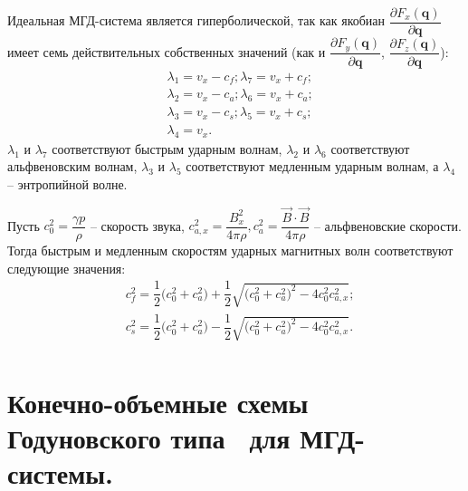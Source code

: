 \documentclass[14pt, a4paper, fleqn]{extreport}
\begin{document}
    Идеальная МГД-система является гиперболической,
    так как якобиан $\dfrac{\partial F_x(\textbf{q})}{\partial \textbf{q}}$
    имеет семь действительных собственных значений
    (как и 
    $\dfrac{\partial F_y(\textbf{q})}{\partial \textbf{q}}$,
    $\dfrac{\partial F_z(\textbf{q})}{\partial \textbf{q}}$):
    \begin{equation*}
    \begin{split}
        &\lambda_1 = v_x - c_f; \lambda_7 = v_x + c_f; \\
        &\lambda_2 = v_x - c_a; \lambda_6 = v_x + c_a; \\
        &\lambda_3 = v_x - c_s; \lambda_5 = v_x + c_s; \\
        &\lambda_4 = v_x.
    \end{split}
    \end{equation*}
    $\lambda_1$ и $\lambda_7$ соответствуют быстрым ударным волнам,
    $\lambda_2$ и $\lambda_6$ соответствуют альфвеновским волнам,
    $\lambda_3$ и $\lambda_5$ соответствуют медленным ударным волнам, а
    $\lambda_4$ -- энтропийной волне.
    
    Пусть 
    $c_0^2 = \dfrac{\gamma p}{\rho}$ -- скорость звука,
    $c_{a,x}^2 = \dfrac{B_x^2}{4\pi\rho}, 
     c_a^2 = \dfrac{\vec{B}\cdot\vec{B}}{4\pi\rho}$ -- альфвеновские скорости.
    Тогда быстрым и медленным скоростям ударных магнитных волн соответствуют следующие значения:
    \begin{equation*}
    \begin{split}
        &c_f^2 
            = \dfrac{1}{2}\big( c_0^2 + c_a^2 \big)    
            + \dfrac{1}{2}\sqrt{ \big( c_0^2 + c_a^2 \big)^2 - 4c_0^2 c_{a,x}^2 }; \\
        &c_s^2 
            = \dfrac{1}{2}\big( c_0^2 + c_a^2 \big)    
            - \dfrac{1}{2}\sqrt{ \big( c_0^2 + c_a^2 \big)^2 - 4c_0^2 c_{a,x}^2 }. \\
    \end{split}
    \end{equation*}
    
    
    
    
    \chapter{Конечно-объемные схемы Годуновского типа \
             для МГД-системы.}
\end{document}
